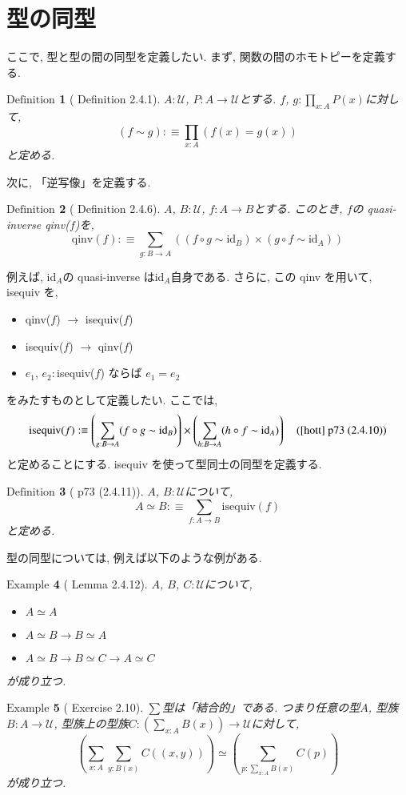 \documentclass[11pt]{jsreport}
\theoremstyle{mystyle}
\newtheorem{df}{$\textrm{Definition}$}[subsection]
\newtheorem{ex}[df]{$\textrm{Example}$}
\newcommand{\bdf}{\begin{shadebox} \begin{df}}
\newcommand{\edf}{\end{df} \end{shadebox}}
\newcommand{\bex}{\begin{ex}}
\newcommand{\eex}{\end{ex}}
\newcommand{\U}{\mathcal{U}}
\newcommand{\id}{\textrm{id}}
\newcommand{\qinv}{\textrm{qinv}}
\newcommand{\iseq}{\textrm{isequiv}}
\newcommand{\0}{\textbf{0}}
\newcommand{\1}{\textbf{1}}
\newcommand{\2}{\textbf{2}}
\begin{document}
\section{型の同型}
ここで, 型と型の間の同型を定義したい. まず, 関数の間のホモトピーを定義する. 
\bdf[\cite{hott} Definition 2.4.1]
  $A : \U$, $P : A \to \U$とする. $f$, $g : \prod_{x : A} P(x)$に対して, 
  \[
    (f \sim g) :\equiv \prod_{x : A} (f(x) = g(x))
  \]
  と定める. 
\edf
次に, 「逆写像」を定義する. 
\bdf[\cite{hott} Definition 2.4.6]
  $A$, $B : \U$, $f : A \to B$とする. このとき, $f$の quasi-inverse qinv($f$)を, 
  \[
    \qinv(f) :\equiv \sum_{g : B \to A} ((f \circ g \sim \id_B) \times
                                                   (g \circ f \sim \id_A))
  \]
\edf
例えば, id$_A$の quasi-inverse はid$_A$自身である. さらに, この qinv を用いて, isequiv を, 
\begin{itemize}
  \item qinv($f$) $\to$ isequiv($f$)
  \item isequiv($f$) $\to$ qinv($f$)
  \item $e_1$, $e_2 :$isequiv($f$) ならば $e_1 = e_2$
\end{itemize}
をみたすものとして定義したい. ここでは, 
\[
  \iseq(f) :\equiv \left( \sum_{g : B \to A} (f \circ g \sim \id_B) \right) \times
                           \left( \sum_{h : B \to A} (h \circ f \sim \id_A) \right) \quad
                           \text{(\cite{hott} p73 (2.4.10))}
\]
と定めることにする. isequiv を使って型同士の同型を定義する. 
\bdf[\cite{hott} p73 (2.4.11)]
  $A$, $B : \U$について, 
  \[
    A \simeq B :\equiv \sum_{f : A \to B} \iseq(f)
  \]
  と定める. 
\edf
型の同型については, 例えば以下のような例がある. 
\bex[\cite{hott} Lemma 2.4.12]
$A$, $B$, $C : \U$について, 
\begin{itemize}
  \item $A \simeq A$
  \item $A \simeq B \to B \simeq A$
  \item $A \simeq B \to B \simeq C \to A \simeq C$
\end{itemize}
が成り立つ. 
\eex
\bex[\cite{hott} Exercise 2.10] \label{ex sigA}
  $\sum$型は「結合的」である. つまり任意の型$A$, 型族$B : A \to \U$, 
  型族上の型族$C : (\sum_{x : A} B(x)) \to \U$に対して, 
  \[
    \left( \sum_{x : A} \sum_{y : B(x)} C((x, y))\right) \simeq
    \left( \sum_{p : \sum_{x : A} B(x)} C(p) \right)
  \]
  が成り立つ. 
\eex
\end{document}
